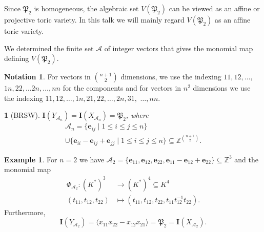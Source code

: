 \documentclass[mathserif,handout]{beamer}
\newcommand{\pr}{\mathfrak P}
\newcommand{\vect}[1]{\mathbf#1}
\newcommand{\Z}{\mathbb Z}
\theoremstyle{plain}
\newtheorem{prop}[thm]{\color{white}{Proposition}}
\theoremstyle{definition}
\newtheorem{ex}[thm]{Example}
\newtheorem{ntn}[thm]{Notation}
\theoremstyle{remark}
\begin{document}
\begin{frame}
Since $\pr_2$ is homogeneous, the algebraic set $V(\pr_2)$ can be viewed as an affine or projective toric variety.  In this talk we will mainly regard $V(\pr_2)$ as an affine toric variety.  

\pause
\vspace{0.75pc}
We determined the finite set $\mathscr A$ of integer vectors that gives the monomial map defining $V(\pr_2)$. 
\end{frame}

\begin{frame}
\begin{ntn}
For vectors in $\binom{n+1}{2}$ dimensions, we use the indexing $11,12,\dots,$ $1n,22,\dots 2n,\dots,nn$ for the components and for vectors in $n^2$ dimensions we use the indexing $11,12,\dots,1n,21,22,\dots,2n,31,$ $\dots,nn$.
\end{ntn}

\pause
\begin{prop}[BRSW]
\label{prop:A_n}
$\vect I(Y_{\mathscr A_n})=\vect I(X_{\mathscr A_n})=\pr_2$, where 
\begin{multline*}
\mathscr A_n = \{\vect e_{ij}\mid 1\leq i\leq j\leq n\} \\
\cup \{\vect e_{ii}-\vect e_{ij}+\vect e_{jj}\mid 1\leq i\leq j\leq n\}\subseteq \Z^{\binom{n+1}{2}}.
\end{multline*}
\end{prop}
\end{frame}

\begin{frame}
\begin{ex}
For $n=2$ we have 
$\mathscr A_2 = \{\vect e_{11},\vect e_{12},\vect e_{22},\vect e_{11}-\vect e_{12}+\vect e_{22}\}\subseteq\Z^3
$ %
and the monomial map
\begin{align*}
\Phi_{\mathscr A_2}: (K^*)^3 &\to (K^*)^4\subseteq K^4 \\
(t_{11},t_{12},t_{22}) &\mapsto (t_{11},t_{12},t_{22},t_{11}t_{12}^{-1}t_{22}).
\end{align*} Furthermore, 
\[
\vect I(Y_{\mathscr A_2})= \langle x_{11}x_{22}-x_{12}x_{21}\rangle=\pr_2=\vect I(X_{\mathscr A_2}).
\]
\end{ex}
\end{frame}

\end{document}

